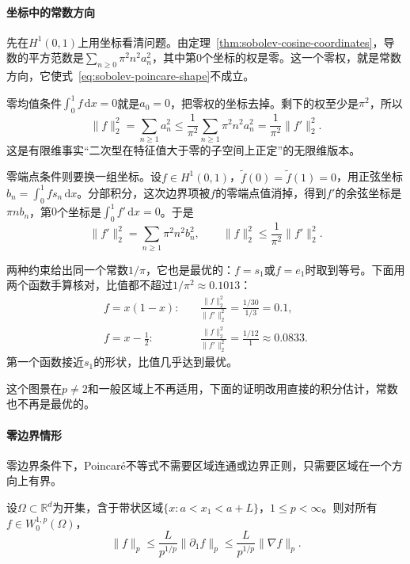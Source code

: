 \paragraph{坐标中的常数方向}
先在$H^1(0,1)$上用坐标看清问题。由定理~\ref{thm:sobolev-cosine-coordinates}，导数的平方范数是$\sum_{n\geq0}\pi^2n^2a_n^2$，其中第$0$个坐标的权是零。这一个零权，就是常数方向，它使式~\eqref{eq:sobolev-poincare-shape}不成立。

零均值条件$\int_0^1f\,\mathrm dx=0$就是$a_0=0$，把零权的坐标去掉。剩下的权至少是$\pi^2$，所以
\[
\lVert f\rVert_2^2=\sum_{n\geq1}a_n^2\leq\frac1{\pi^2}\sum_{n\geq1}\pi^2n^2a_n^2=\frac1{\pi^2}\lVert f'\rVert_2^2 .
\]
这是有限维事实“二次型在特征值大于零的子空间上正定”的无限维版本。

零端点条件则要换一组坐标。设$f\in H^1(0,1)$，$\tilde f(0)=\tilde f(1)=0$，用正弦坐标$b_n=\int_0^1fs_n\,\mathrm dx$。分部积分，这次边界项被$f$的零端点值消掉，得到$f'$的余弦坐标是$\pi nb_n$，第$0$个坐标是$\int_0^1f'\,\mathrm dx=0$。于是
\[
\lVert f'\rVert_2^2=\sum_{n\geq1}\pi^2n^2b_n^2,\qquad
\lVert f\rVert_2^2\leq\frac1{\pi^2}\lVert f'\rVert_2^2 .
\]

两种约束给出同一个常数$1/\pi$，它也是最优的：$f=s_1$或$f=e_1$时取到等号。下面用两个函数手算核对，比值都不超过$1/\pi^2\approx0.1013$：
\[
\begin{aligned}
f=x(1-x):&\quad \frac{\lVert f\rVert_2^2}{\lVert f'\rVert_2^2}=\frac{1/30}{1/3}=0.1,\\
f=x-\tfrac12:&\quad \frac{\lVert f\rVert_2^2}{\lVert f'\rVert_2^2}=\frac{1/12}{1}\approx0.0833 .
\end{aligned}
\]
第一个函数接近$s_1$的形状，比值几乎达到最优。

这个图景在$p\neq2$和一般区域上不再适用，下面的证明改用直接的积分估计，常数也不再是最优的。

\paragraph{零边界情形}
零边界条件下，Poincaré不等式不需要区域连通或边界正则，只需要区域在一个方向上有界。

\begin{theorem}[零边界的Poincaré不等式]
\label{thm:sobolev-poincare-zero}
设$\Omega\subset\mathbb R^d$为开集，含于带状区域$\{x:a<x_1<a+L\}$，$1\leq p<\infty$。则对所有$f\in W_0^{1,p}(\Omega)$，
\begin{equation}
\lVert f\rVert_p\leq\frac{L}{p^{1/p}}\lVert\partial_1f\rVert_p\leq\frac{L}{p^{1/p}}\lVert\nabla f\rVert_p .
\label{eq:sobolev-poincare-zero}
\end{equation}
\end{theorem}

